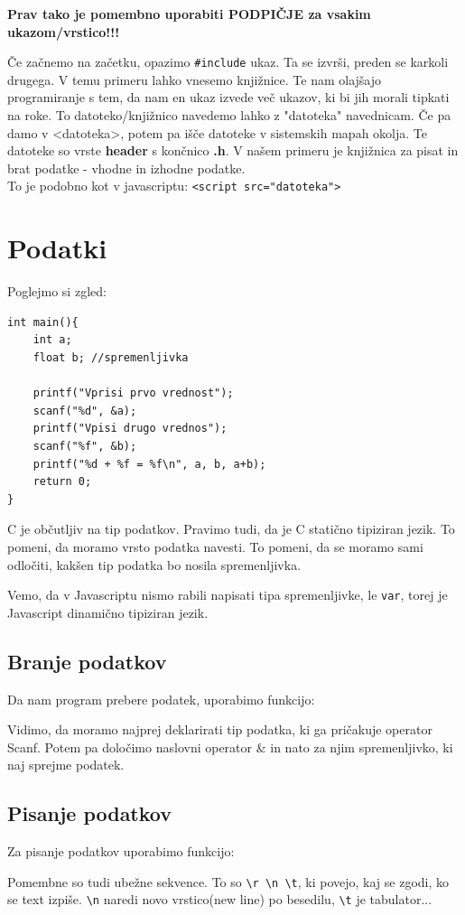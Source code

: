 \documentclass[a4paper, 12pt]{article}
\begin{document}
\textbf{Prav tako je pomembno uporabiti PODPIČJE za vsakim ukazom/vrstico!!!}

Če začnemo na začetku, opazimo \texttt{\#include} ukaz. Ta se izvrši, preden se karkoli drugega. V temu primeru lahko vnesemo knjižnice. Te nam olajšajo programiranje s tem, da nam en ukaz izvede več ukazov, ki bi jih morali tipkati na roke. To datoteko/knjižnico navedemo lahko z "datoteka" navednicam. Če pa damo v <datoteka>, potem pa išče datoteke v sistemskih mapah okolja. Te datoteke so vrste \textbf{header} s končnico \textbf{.h}. V našem primeru je knjižnica za pisat in brat podatke - vhodne in izhodne podatke.\\
To je podobno kot v javascriptu:  \lstinline|<script src="datoteka">|\ 
\section{Podatki}
Poglejmo si zgled:
\begin{lstlisting}
int main(){
	int a;
	float b; //spremenljivka

	printf("Vprisi prvo vrednost");
	scanf("%d", &a);
	printf("Vpisi drugo vrednos");
	scanf("%f", &b);
	printf("%d + %f = %f\n", a, b, a+b);
	return 0;
}
\end{lstlisting}

C je občutljiv na tip podatkov. Pravimo tudi, da je C statično tipiziran jezik. To pomeni, da moramo vrsto podatka navesti. 
To pomeni, da se moramo sami odločiti, kakšen tip podatka bo nosila spremenljivka.

Vemo, da v Javascriptu nismo rabili napisati tipa spremenljivke, le \texttt{var}, torej je Javascript dinamično tipiziran jezik.

\subsection{Branje podatkov}
Da nam program prebere podatek, uporabimo funkcijo:

\begin{center}
\end{center}

Vidimo, da moramo najprej deklarirati tip podatka, ki ga pričakuje operator Scanf. Potem pa določimo naslovni operator \& in nato za njim spremenljivko, ki naj sprejme podatek.

\subsection{Pisanje podatkov}
Za pisanje podatkov uporabimo funkcijo:
\begin{center}
\end{center}
Pomembne so tudi ubežne sekvence. To so \verb|\r \n \t|, ki povejo, kaj se zgodi, ko se text izpiše. \verb|\n| naredi novo vrstico(new line) po besedilu, \verb|\t| je tabulator...
\end{document}
